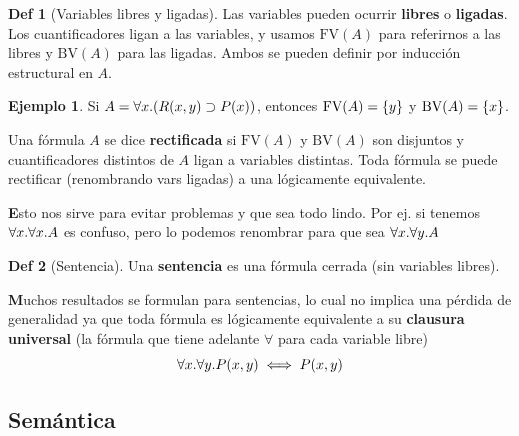 \documentclass{report}
\theoremstyle{definition} %
\newtheorem*{definition*}{Def}
\newtheorem*{example*}{Ejemplo}
\newenvironment{nota}[1]
    {\begin{leftbar}\textbf{#1}}
    {\end{leftbar}}
\newcommand{\fv}[1]{\text{FV}(#1)} %
\newcommand{\bv}[1]{\text{BV}(#1)} %
\begin{document}
\begin{definition*}[Variables libres y ligadas]
    Las variables pueden ocurrir \textbf{libres} o \textbf{ligadas}. Los
    cuantificadores ligan a las variables, y usamos $\fv{A}$ para referirnos a
    las libres y $\bv{A}$ para las ligadas. Ambos se pueden definir por
    inducción estructural en $A$.
    \begin{example*}
        Si $A = \forall x . (R(x, y) \supset P(x))$, entonces $\fv{A} =
        \set{y}$ y $\bv{A} = \set{x}$.
    \end{example*}

    Una fórmula $A$ se dice \textbf{rectificada} si $\fv{A}$ y $\bv{A}$ son
    disjuntos y cuantificadores distintos de $A$ ligan a variables distintas.
    Toda fórmula se puede rectificar (renombrando vars ligadas) a una
    lógicamente equivalente.
    
    \begin{nota}
        Esto nos sirve para evitar problemas y que sea todo lindo. Por ej. si
        tenemos $\forall x . \forall x . A$ es confuso, pero lo podemos
        renombrar para que sea $\forall x . \forall y . A$
    \end{nota}
\end{definition*}

\begin{definition*}[Sentencia]
    Una \textbf{sentencia} es una fórmula cerrada (sin variables libres).

    \begin{nota}
        Muchos resultados se formulan para sentencias, lo cual no implica una
        pérdida de generalidad ya que toda fórmula es lógicamente equivalente a
        su \textbf{clausura universal} (la fórmula que tiene adelante $\forall$
        para cada variable libre)
        \[
            \forall x . \forall y . P(x, y) \iff P(x, y)
        \]
    \end{nota}
\end{definition*}

\subsection{Semántica}
\end{document}
